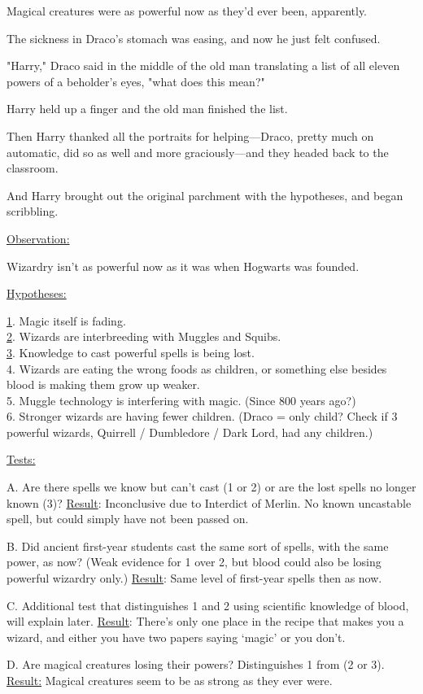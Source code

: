Magical creatures were as powerful now as they'd ever been, apparently.

The sickness in Draco's stomach was easing, and now he just felt confused.

"Harry," Draco said in the middle of the old man translating a list of all 
eleven powers of a beholder's eyes, "what does this mean?"

Harry held up a finger and the old man finished the list.

Then Harry thanked all the portraits for helping---Draco, pretty much on 
automatic, did so as well and more graciously---and they headed back to the 
classroom.

And Harry brought out the original parchment with the hypotheses, and began 
scribbling.

\begin{writtenNote}
\underline{Observation:}

Wizardry isn't as powerful now as it was when Hogwarts was founded.

\underline{Hypotheses:}

\noindent{}\underline{1}. Magic itself is fading.\\
\underline{2}. Wizards are interbreeding with Muggles and Squibs.\\
\underline{3}. Knowledge to cast powerful spells is being lost.\\
4. Wizards are eating the wrong foods as children, or something else besides 
blood is making them grow up weaker.\\
5. Muggle technology is interfering with magic. (Since 800 years ago?)\\
6. Stronger wizards are having fewer children. (Draco = only child? Check if 3 
powerful wizards, Quirrell / Dumbledore / Dark Lord, had any children.)

\underline{Tests:}

A. Are there spells we know but can't cast (1 or 2) or are the lost 
spells no longer known (3)? \underline{Result}: Inconclusive due to Interdict 
of Merlin. No known uncastable spell, but could simply have not been passed on.

B. Did ancient first-year students cast the same sort of spells, with the 
same power, as now? (Weak evidence for 1 over 2, but blood could also be losing 
powerful wizardry only.) \underline{Result}: Same level of first-year spells 
then as now.

C. Additional test that distinguishes 1 and 2 using scientific knowledge 
of blood, will explain later. \underline{Result}: There's only one place in the 
recipe that makes you a wizard, and either you have two papers saying `magic' 
or you don't.

D. Are magical creatures losing their powers? Distinguishes 1 from (2 or 
3). \underline{Result:} Magical creatures seem to be as strong as they ever 
were.
\end{writtenNote}

